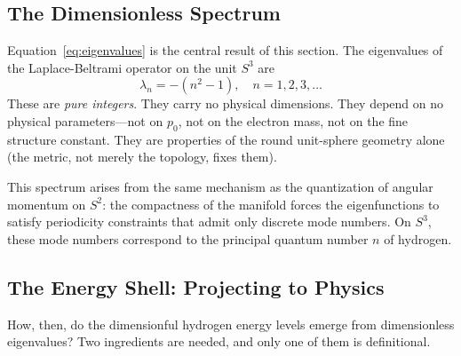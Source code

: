 \documentclass[aps,pra,twocolumn,superscriptaddress,longbibliography]{revtex4-2}
\begin{document}
\subsection{The Dimensionless Spectrum}

Equation~\eqref{eq:eigenvalues} is the central result of this section. The eigenvalues of the Laplace-Beltrami operator on the unit $S^3$ are
\begin{equation}
\lambda_n = -(n^2 - 1), \quad n = 1, 2, 3, \ldots
\label{eq:s3_spectrum}
\end{equation}
These are \textit{pure integers}. They carry no physical dimensions. They depend on no physical parameters---not on $p_0$, not on the electron mass, not on the fine structure constant. They are properties of the round unit-sphere geometry alone (the metric, not merely the topology, fixes them).

This spectrum arises from the same mechanism as the quantization of angular momentum on $S^2$: the compactness of the manifold forces the eigenfunctions to satisfy periodicity constraints that admit only discrete mode numbers. On $S^3$, these mode numbers correspond to the principal quantum number $n$ of hydrogen.

\subsection{The Energy Shell: Projecting to Physics}
\label{sec:energy_shell}

How, then, do the dimensionful hydrogen energy levels emerge from dimensionless eigenvalues? Two ingredients are needed, and only one of them is definitional.
\end{document}
